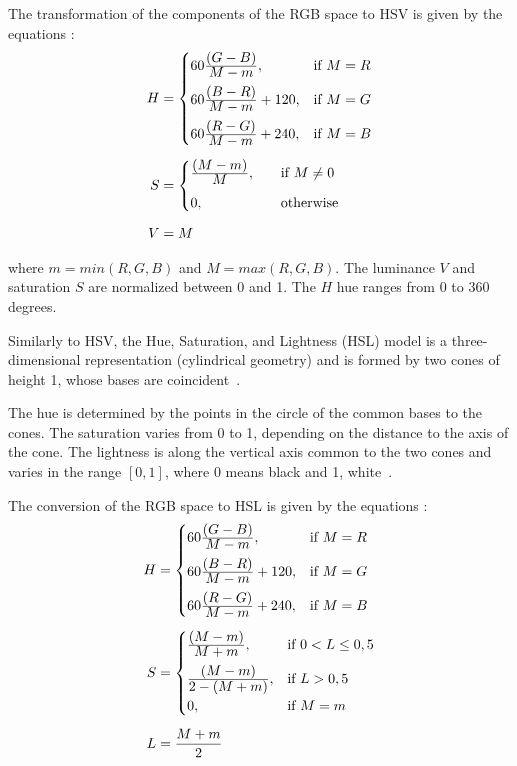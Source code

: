 The transformation of the components of the RGB space to HSV is given by the equations \citep{pedrini:08}:
\begin{align}
\label{eq:rgb_para_hsv}
\begin{split}
  H &=  \begin{cases}
            60\frac{\displaystyle (G - B)}{\displaystyle M - m}, & \text{if}\ M = R\\[0.7em]
            60\frac{\displaystyle (B - R)}{\displaystyle M - m} + 120, & \text{if}\ M = G\\[0.7em]
            60\frac{\displaystyle (R - G)}{\displaystyle M - m} + 240, & \text{if}\ M = B
       \end{cases}
  \\[0.5em]
  S &=  \begin{cases}
            \frac{\displaystyle (M - m)}{\displaystyle M}, \quad &\text{if}\ M \neq 0\\[0.7em]
            0, \quad &\text{otherwise}\\
       \end{cases}
  \\[0.5em]
  V &= M
\end{split}
\end{align}

\noindent where $m = min(R, G ,B)$ and $M = max(R, G ,B)$. The luminance $V$ and saturation $S$ are normalized between 0 and 1. The $H$ hue ranges from 0 to 360 degrees.

Similarly to HSV, the Hue, Saturation, and Lightness (HSL) model is a three-dimensional representation (cylindrical geometry) and is formed by two cones of height 1, whose bases are coincident~\citep{pedrini:08}.

The hue is determined by the points in the circle of the common bases to the cones. The saturation varies from 0 to 1, depending on the distance to the axis of the cone. The lightness is along the vertical axis common to the two cones and varies in the range $[0, 1]$, where 0 means black and 1, white~\citep{pedrini:08}.

The conversion of the RGB space to HSL is given by the equations \citep{pedrini:08}:
\begin{align}
\label{eq:rgb_para_hsl}
\begin{split}
  H &=  \begin{cases}
            60\frac{\displaystyle (G - B)}{\displaystyle M - m}, & \text{if}\ M = R\\[0.7em]
            60\frac{\displaystyle (B - R)}{\displaystyle M - m} + 120, & \text{if}\ M = G\\[0.7em]
            60\frac{\displaystyle (R - G)}{\displaystyle M - m} + 240, & \text{if}\ M = B
       \end{cases}
  \\[0.5em]
  S &=  \begin{cases}
            \frac{\displaystyle (M - m)}{\displaystyle M + m}, & \text{if}\ 0 < L \leq 0,5\\[0.7em]
            \frac{\displaystyle (M - m)}{\displaystyle 2 - (M + m)}, & \text{if}\ L > 0,5\\[0.5em]
            0, & \text{if}\ M = m\\
       \end{cases}
  \\[0.5em]
  L &= \frac{M + m}{2}
\end{split}
\end{align}

